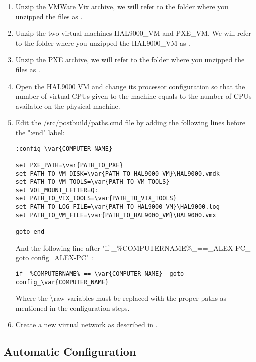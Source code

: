 \begin{appendices}
\begin{enumerate}
	\item Unzip the VMWare Vix archive, we will refer to the folder where you unzipped the files as
.

	\item Unzip the two virtual machines HAL9000\_VM and PXE\_VM. We will refer to the folder where
you unzipped the HAL9000\_VM as .

	\item Unzip the PXE archive, we will refer to the folder where you unzipped the files as
.

	\item Open the HAL9000 VM and change its processor configuration so that the number of virtual
CPUs given to the machine equals to the number of CPUs available on the physical machine.

	\item Edit the /src/postbuild/paths.cmd file by adding the
following lines before the ":end" label:

\begin{verbatim}
:config_\var{COMPUTER_NAME}

set PXE_PATH=\var{PATH_TO_PXE}
set PATH_TO_VM_DISK=\var{PATH_TO_HAL9000_VM}\HAL9000.vmdk
set PATH_TO_VM_TOOLS=\var{PATH_TO_VM_TOOLS}
set VOL_MOUNT_LETTER=Q:
set PATH_TO_VIX_TOOLS=\var{PATH_TO_VIX_TOOLS}
set PATH_TO_LOG_FILE=\var{PATH_TO_HAL9000_VM}\HAL9000.log
set PATH_TO_VM_FILE=\var{PATH_TO_HAL9000_VM}\HAL9000.vmx

goto end
\end{verbatim}

And the following line after "if \_\%COMPUTERNAME\%\_==\_ALEX-PC\_ goto config\_ALEX-PC" :
\begin{verbatim}
if _%COMPUTERNAME%_==_\var{COMPUTER_NAME}_ goto config_\var{COMPUTER_NAME}
\end{verbatim}

Where the \textbackslash raw variables must be replaced with the proper paths as mentioned in the
configuration steps.

	\item Create a new virtual network as described in .
\end{enumerate}

\subsection{Automatic Configuration}
\label{sect:AutoConf}


\end{appendices}
